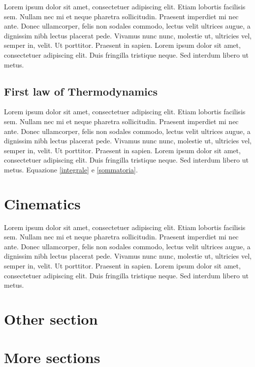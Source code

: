 Lorem ipsum dolor sit amet, consectetuer adipiscing elit. Etiam lobortis facilisis
sem. Nullam nec mi et neque pharetra sollicitudin. Praesent imperdiet mi nec
ante. Donec ullamcorper, felis non sodales commodo, lectus velit ultrices augue,
a dignissim nibh lectus placerat pede. Vivamus nunc nunc, molestie ut, ultricies
vel, semper in, velit. Ut porttitor. Praesent in sapien. Lorem ipsum dolor sit
amet, consectetuer adipiscing elit. Duis fringilla tristique neque. Sed interdum
libero ut metus. 

\subsection{First law of Thermodynamics}
Lorem ipsum dolor sit amet, consectetuer adipiscing elit. Etiam lobortis facilisis
sem. Nullam nec mi et neque pharetra sollicitudin. Praesent imperdiet mi nec
ante. Donec ullamcorper, felis non sodales commodo, lectus velit ultrices augue,
a dignissim nibh lectus placerat pede. Vivamus nunc nunc, molestie ut, ultricies
vel, semper in, velit. Ut porttitor. Praesent in sapien. Lorem ipsum dolor sit
amet, consectetuer adipiscing elit. Duis fringilla tristique neque. Sed interdum
libero ut metus. Equazione \ref{integrale} e \ref{sommatoria}.

\section{Cinematics}
Lorem ipsum dolor sit amet, consectetuer adipiscing elit. Etiam lobortis facilisis
sem. Nullam nec mi et neque pharetra sollicitudin. Praesent imperdiet mi nec
ante. Donec ullamcorper, felis non sodales commodo, lectus velit ultrices augue,
a dignissim nibh lectus placerat pede. Vivamus nunc nunc, molestie ut, ultricies
vel, semper in, velit. Ut porttitor. Praesent in sapien. Lorem ipsum dolor sit
amet, consectetuer adipiscing elit. Duis fringilla tristique neque. Sed interdum
libero ut metus.


\section{Other section}
\section{More sections}

